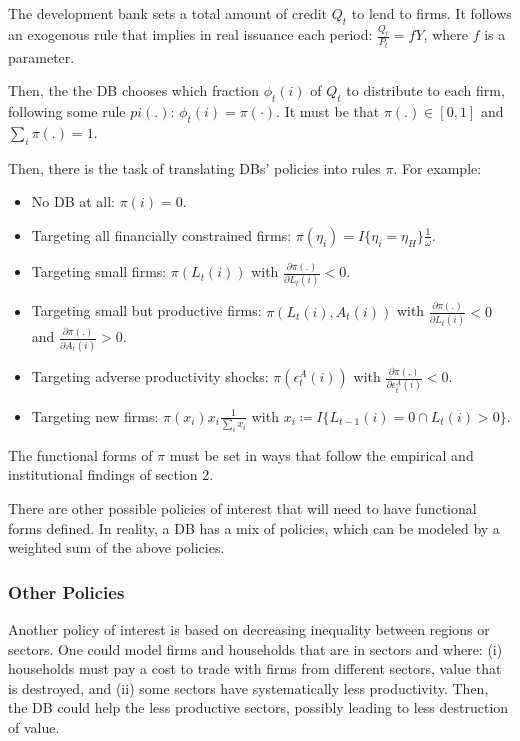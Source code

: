 \documentclass[12pt]{article}
\begin{document}
The development bank sets a total amount of credit $Q_{t}$ to lend to firms. It follows an exogenous rule that implies in real issuance each period: $\frac{Q_{t}}{P_t} = fY$, where $f$ is a parameter.

Then, the the DB chooses which fraction $\phi_t(i)$ of $Q_{t}$ to distribute to each firm, following some rule $pi(.)$: $\phi_t(i) = \pi(\cdot)$. It must be that $\pi(.) \in [0,1]$ and $\sum_i \pi(.) = 1$.

Then, there is the task of translating DBs' policies into rules $\pi$. For example:

\begin{itemize}
    \item No DB at all: $\pi(i) = 0$.
    \item Targeting all financially constrained firms: $\pi(\eta_i) = I\{\eta_i = \eta_H\}\frac{1}{\omega}$.
    \item Targeting small firms: $\pi(L_t(i))$ with $\frac{\partial \pi(.)}{\partial L_t(i)} < 0$.
    \item Targeting small but productive firms: $\pi(L_t(i), A_t(i))$ with $\frac{\partial \pi(.)}{\partial L_t(i)} < 0$ and $\frac{\partial \pi(.)}{\partial A_t(i)} > 0$.
    \item Targeting adverse productivity shocks: $\pi(\epsilon^A_t(i))$ with $\frac{\partial \pi(.)}{\partial \epsilon^A_t(i)} < 0$.
    \item Targeting new firms: $\pi(x_i) x_i \frac{1}{\sum_i x_i}$ with $x_i \coloneqq I\{L_{t-1}(i) = 0 \cap L_{t}(i) > 0\}$.
\end{itemize}

The functional forms of $\pi$ must be set in ways that follow the empirical and institutional findings of section 2.

There are other possible policies of interest that will need to have functional forms defined. In reality, a DB has a mix of policies, which can be modeled by a weighted sum of the above policies.


\subsubsection{Other Policies}

Another policy of interest is based on decreasing inequality between regions or sectors. One could model firms and households that are in sectors and where: (i) households must pay a cost to trade with firms from different sectors, value that is destroyed, and (ii) some sectors have systematically less productivity. Then, the DB could help the less productive sectors, possibly leading to less destruction of value.
\end{document}
